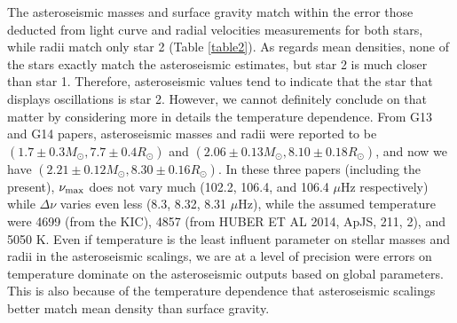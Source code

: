 


The asteroseismic masses and surface gravity match within the error those deducted from light curve and radial velocities measurements for both stars, while radii match only star 2 (Table \ref{table2}). As regards mean densities, none of the stars exactly match the asteroseismic estimates, but star 2 is much closer than star 1. Therefore, asteroseismic values tend to indicate that the star that displays oscillations is star 2. However, we cannot definitely conclude on that matter by considering more in details the temperature dependence. From G13 and G14 papers, asteroseismic masses and radii were reported to be $(1.7\pm0.3 M_\odot, 7.7\pm0.4 R_\odot)$ and $(2.06\pm0.13 M_\odot, 8.10\pm0.18 R_\odot)$, and now we have $(2.21\pm0.12 M_\odot, 8.30\pm0.16 R_\odot)$. In these three papers (including the present), $\nu_{\rm{max}}$ does not vary much (102.2, 106.4, and 106.4 $\mu$Hz respectively) while $\Delta\nu$ varies even less (8.3, 8.32, 8.31 $\mu$Hz), while the assumed temperature were 4699 (from the KIC), 4857 (from HUBER ET AL 2014, ApJS, 211, 2), and 5050 K. Even if temperature is the least influent parameter on stellar masses and radii in the asteroseismic scalings, we are at a level of precision were errors on temperature dominate on the asteroseismic outputs based on global parameters. This is also because of the temperature dependence that asteroseismic scalings better match mean density than surface gravity.


